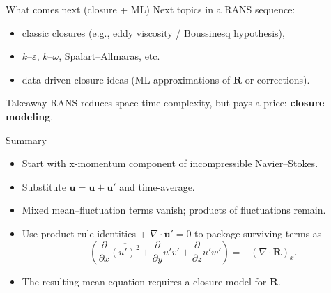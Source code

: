\documentclass[aspectratio=169]{beamer}
\newcommand{\uu}{\bm{u}}
\newcommand{\avg}[1]{\overline{#1}}
\newcommand{\up}{\uu'}
\newcommand{\ubar}{\avg{\uu}}
\newcommand{\Div}{\nabla\cdot}
\begin{document}
\begin{frame}{What comes next (closure + ML)}
Next topics in a RANS sequence:
\begin{itemize}
  \item classic closures (e.g., eddy viscosity / Boussinesq hypothesis),
  \item $k$--$\varepsilon$, $k$--$\omega$, Spalart--Allmaras, etc.
  \item data-driven closure ideas (ML approximations of $\bm{R}$ or corrections).
\end{itemize}

\begin{block}{Takeaway}
RANS reduces space-time complexity, but pays a price: \textbf{closure modeling}.
\end{block}
\end{frame}

\begin{frame}{Summary}
\begin{itemize}
  \item Start with x-momentum component of incompressible Navier--Stokes.
  \item Substitute $\uu=\ubar+\up$ and time-average.
  \item Mixed mean--fluctuation terms vanish; products of fluctuations remain.
  \item Use product-rule identities + $\Div\up=0$ to package surviving terms as
  \[
  -\left(\frac{\partial}{\partial x}\avg{(u')^2}+\frac{\partial}{\partial y}\avg{u'v'}+\frac{\partial}{\partial z}\avg{u'w'}\right)
  = -(\Div \bm{R})_x.
  \]
  \item The resulting mean equation requires a closure model for $\bm{R}$.
\end{itemize}
\end{frame}
\end{document}
